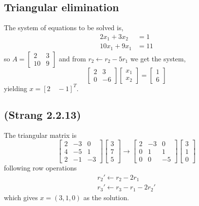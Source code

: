 \documentclass[10pt]{article}
\begin{document}
\subsection{Triangular elimination}
The system of equations to be solved is,
\begin{align*}
	2x_1 + 3x_2 &= 1 \\
	10x_1 + 9x_1 &= 11
\end{align*}
so $A = \begin{bmatrix}2 & 3\\ 10 & 9\end{bmatrix}$ and from $r_2 \leftarrow r_2 - 5r_1$ we get the system,
\[ 
\begin{bmatrix}2& 3\\0&-6\end{bmatrix}\begin{bmatrix}x_1\\x_2\end{bmatrix} = \begin{bmatrix}1\\6\end{bmatrix}\]
yielding $x = [2\quad -1]^T$.

\subsection{(Strang 2.2.13)}
The triangular matrix is 
\[
\begin{bmatrix}
	2& -3& 0\\
	4& -5& 1\\
	2& -1&-3
\end{bmatrix}\begin{bmatrix}3\\7\\5\end{bmatrix} \rightarrow
\begin{bmatrix}
	2& -3& 0\\
	0& 1& 1\\
	0& 0& -5
\end{bmatrix}\begin{bmatrix}3\\1\\0\end{bmatrix}
\]
following row operations
\begin{align*}
	r_2' \leftarrow r_2 - 2r_1 \\
	r_3' \leftarrow r_3 - r_1 - 2r_2'
\end{align*}
which gives $x = (3,1,0)$ as the solution.
\end{document}
